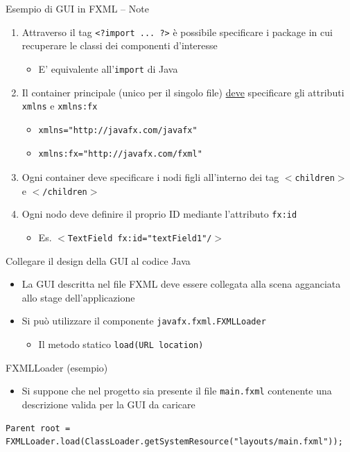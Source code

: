 \documentclass[presentation]{beamer}
\begin{document}
\begin{frame}[fragile]{Esempio di GUI in FXML -- Note}
\begin{enumerate}\itemsep15pt
\item Attraverso il tag \texttt{<?import ... ?>} è possibile specificare i package in cui recuperare le classi dei componenti d'interesse
\begin{itemize}
\item E' equivalente all'\texttt{import} di Java
\end{itemize}
\item Il container principale (unico per il singolo file) \underline{deve} specificare gli attributi \texttt{xmlns} e \texttt{xmlns:fx}
\begin{itemize}
\item \begin{verbatim}xmlns="http://javafx.com/javafx"\end{verbatim}
\item \begin{verbatim}xmlns:fx="http://javafx.com/fxml"\end{verbatim}
\end{itemize}
\item Ogni container deve specificare i nodi figli all'interno dei tag \texttt{$<$children$>$} e \texttt{$<$/children$>$}
\item Ogni nodo deve definire il proprio ID mediante l'attributo \texttt{fx:id}
\begin{itemize}
\item Es. \texttt{$<$TextField fx:id="textField1"/$>$}
\end{itemize}
\end{enumerate}
\end{frame}

\begin{frame}[fragile]{Collegare il design della GUI al codice Java}
\begin{itemize}\itemsep10pt
\item La GUI descritta nel file FXML deve essere collegata alla scena agganciata allo stage dell'applicazione
\item Si può utilizzare il componente \texttt{javafx.fxml.FXMLLoader}
\begin{itemize}
\item Il metodo statico \texttt{load(URL location)} 
\end{itemize}
\end{itemize}
\begin{block}{FXMLLoader (esempio)}
\begin{itemize}
\item Si suppone che nel progetto sia presente il file \texttt{main.fxml} contenente una descrizione valida per la GUI da caricare
\end{itemize}
\begin{lstlisting}
Parent root = FXMLLoader.load(ClassLoader.getSystemResource("layouts/main.fxml"));
\end{lstlisting}
\end{block}
\end{frame}
\end{document}

